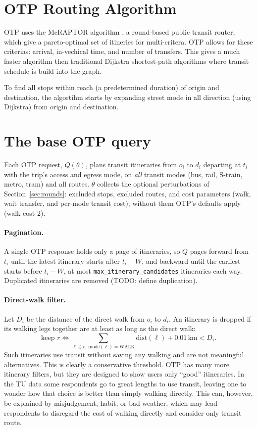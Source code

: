 \documentclass[11pt,a4paper]{article}
\newcommand{\code}[1]{\texttt{#1}}
\begin{document}
\section{OTP Routing Algorithm}
OTP uses the McRAPTOR algorithm \parencite{RAPTOR}, a round-based public transit router, which give a pareto-optimal set of itineries for multi-critera. OTP allows for these criterias: arrival, in-vechical time, and number of transfers. This gives a much faster algorithm then traditional Dijkstra shortest-path algorithms where transit schedule is build into the graph.

To find all stops within reach (a predetermined duration) of origin and destination, the algortihm starts by expanding street mode in all direction (using Dijkstra) from origin and destination.



\section{The base OTP query}
\label{sec:query}

Each OTP request, $Q(\theta)$, plans transit itineraries from $o_i$ to $d_i$ departing at $t_i$ with
the trip's access and egress mode, on \emph{all} transit modes (bus, rail, S-train, metro, tram) and
all routes. $\theta$ collects the optional perturbations of Section~\ref{sec:rounds}: excluded stops,
excluded routes, and cost parameters (walk, wait transfer, and per-mode transit cost);
without them OTP's defaults apply (walk cost 2).

\paragraph{Pagination.} A single OTP response holds only a page of itineraries, so $Q$ pages forward
from $t_i$ until the latest itinerary starts after $t_i + W$, and backward until the earliest starts
before $t_i - W$, at most \code{max\_itinerary\_candidates} itineraries each way. Duplicated itineraries are removed (TODO: define duplication).

\paragraph{Direct-walk filter.} Let $D_i$ be the distance of the direct walk from $o_i$ to $d_i$. An
itinerary is dropped if its walking legs together are at least as long as the direct walk:
\begin{equation}
  \text{keep } r \iff \sum_{\ell \in r,\ \text{mode}(\ell)=\text{WALK}} \text{dist}(\ell) + 0.01\,\text{km} < D_i .
\end{equation}
Such itineraries use transit without saving any walking and are not meaningful alternatives. This is
clearly a conservative threshold. OTP has many more itinerary filters, but they are designed to show
users only ``good'' itineraries. In the TU data some respondents go to great lengths to use transit,
leaving one to wonder how that choice is better than simply walking directly. This can, however, be
explained by misjudgement, habit, or bad weather, which may lead respondents to disregard the cost of
walking directly and consider only transit route.
\end{document}
